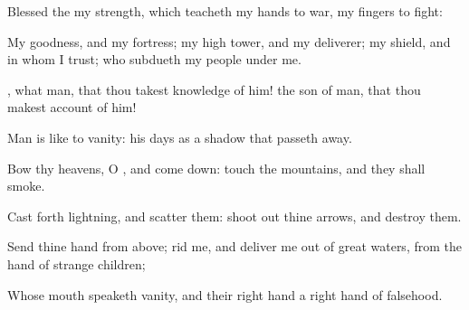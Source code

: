 {\Q {}Blessed
{} the
{} my
strength, which
teacheth my
hands to
war,
{} my
fingers to
fight:


\par }{\Q {}My
goodness, and my
fortress; my high
tower, and my
deliverer; my
shield, and
{} in whom I
trust; who
subdueth my
people under me.


\par }{\Q {}, what
{}
man, that thou takest
knowledge of him!
{} the
son of
man, that thou makest
account of him!


\par }{\Q {}Man is
like to
vanity: his
days
{} as a
shadow that passeth
away.


\par }{\Q {}Bow thy
heavens, O
{}, and come
down:
touch the
mountains, and they shall
smoke.


\par }{\Q {}Cast
forth
lightning, and
scatter them: shoot
out thine
arrows, and
destroy them.


\par }{\Q {}Send thine
hand from
above;
rid me, and
deliver me out of
great
waters, from the
hand of
strange
children;


\par }{\Q {}Whose
mouth
speaketh
vanity, and their right
hand
{} a right
hand of
falsehood.


\par }{\BB \par }
